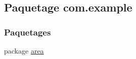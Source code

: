 \hypertarget{namespacecom_1_1example}{}\subsection{Paquetage com.\+example}
\label{namespacecom_1_1example}
\subsubsection*{Paquetages}
\begin{DoxyCompactItemize}
\item 
package \hyperlink{namespacecom_1_1example_1_1area}{area}
\end{DoxyCompactItemize}
